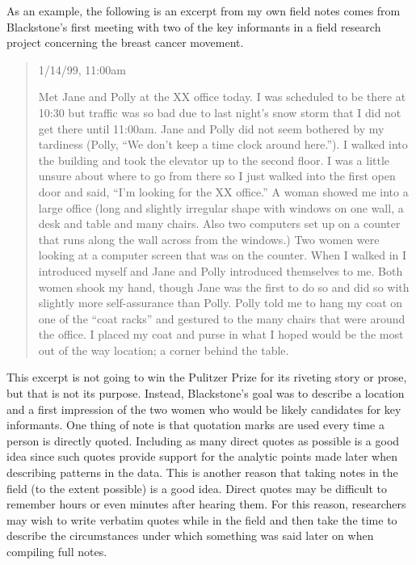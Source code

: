 As an example, the following is an excerpt from my own field notes comes from Blackstone's first meeting with two of the key informants in a field research project concerning the breast cancer movement\cite{blackstone2012principles}.

\begin{quote}
	
1/14/99, 11:00am

Met Jane and Polly at the XX office today. I was scheduled to be there at 10:30 but traffic was so bad due to last night’s snow storm that I did not get there until 11:00am. Jane and Polly did not seem bothered by my tardiness (Polly, ``We don’t keep a time clock around here.''). I walked into the building and took the elevator up to the second floor. I was a little unsure about where to go from there so I just walked into the first open door and said, ``I’m looking for the XX office.'' A woman showed me into a large office (long and slightly irregular shape with windows on one wall, a desk and table and many chairs. Also two computers set up on a counter that runs along the wall across from the windows.) Two women were looking at a computer screen that was on the counter. When I walked in I introduced myself and Jane and Polly introduced themselves to me. Both women shook my hand, though Jane was the first to do so and did so with slightly more self-assurance than Polly. Polly told me to hang my coat on one of the ``coat racks'' and gestured to the many chairs that were around the office. I placed my coat and purse in what I hoped would be the most out of the way location; a corner behind the table.

\end{quote}

This excerpt is not going to win the Pulitzer Prize for its riveting story or prose, but that is not its purpose. Instead, Blackstone's goal was to describe a location and a first impression of the two women who would be likely candidates for key informants. One thing of note is that quotation marks are used every time a person is directly quoted. Including as many direct quotes as possible is a good idea since such quotes provide support for the analytic points made later when describing patterns in the data. This is another reason that taking notes in the field (to the extent possible) is a good idea. Direct quotes may be difficult to remember hours or even minutes after hearing them. For this reason, researchers may wish to write verbatim quotes while in the field and then take the time to describe the circumstances under which something was said later on when compiling full notes.

